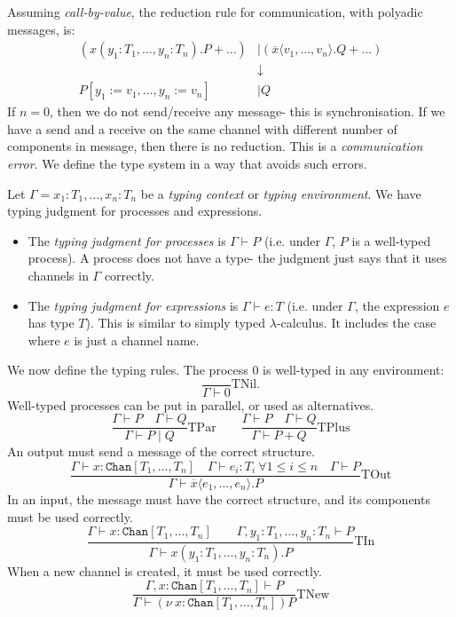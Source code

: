 \documentclass[a4paper, openany]{memoir}
\theoremstyle{definition}
\begin{document}
    Assuming \emph{call-by-value}, the reduction rule for communication, with polyadic messages, is:
    \begin{align*}
        (x(y_1 \colon T_1, \dots, y_n \colon T_n).P + \dots) &\mid 
        (\overline{x}\langle v_1, \dots, v_n \rangle.Q + \dots) \\
        &\downarrow \\
        P[y_1 := v_1, \dots, y_n := v_n] &\mid Q
    \end{align*}
    If $n = 0$, then we do not send/receive any message- this is synchronisation. If we have a send and a receive on the same channel with different number of components in message, then there is no reduction. This is a \emph{communication error}. We define the type system in a way that avoids such errors.

    Let $\Gamma = x_1 \colon T_1, \dots, x_n \colon T_n$ be a \emph{typing context} or \emph{typing environment}. We have typing judgment for processes and expressions.
    \begin{itemize}
        \item The \emph{typing judgment for processes} is $\Gamma \vdash P$ (i.e. under $\Gamma$, $P$ is a well-typed process). A process does not have a type- the judgment just says that it uses channels in $\Gamma$ correctly. 
        \item The \emph{typing judgment for expressions} is $\Gamma \vdash e \colon T$ (i.e. under $\Gamma$, the expression $e$ has type $T$). This is similar to simply typed $\lambda$-calculus. It includes the case where $e$ is just a channel name.
    \end{itemize}
    
    We now define the typing rules. The process $0$ is well-typed in any environment:
    \[\frac{}{\Gamma \vdash 0} \textrm{TNil}.\]
    Well-typed processes can be put in parallel, or used as alternatives.
    \[\frac{\Gamma \vdash P \quad \Gamma \vdash Q}{\Gamma \vdash P \mid Q} \textrm{TPar} \qquad \frac{\Gamma \vdash P \quad \Gamma \vdash Q}{\Gamma \vdash P + Q} \textrm{TPlus}\]
    An output must send a message of the correct structure.
    \[\frac{\Gamma \vdash x \colon \texttt{Chan}[T_1, \dots, T_n] \quad \Gamma \vdash e_i \colon T_i \ \forall 1 \leq i \leq n \quad \Gamma \vdash P}{\Gamma \vdash \overline{x} \langle e_1, \dots, e_n\rangle.P} \textrm{TOut}\]
    In an input, the message must have the correct structure, and its components must be used correctly.
    \[\frac{\Gamma \vdash x \colon \texttt{Chan}[T_1, \dots, T_n] \qquad \Gamma, y_1 \colon T_1, \dots, y_n \colon T_n \vdash P}{\Gamma \vdash x(y_1 \colon T_1, \dots, y_n \colon T_n).P} \textrm{TIn}\]
    When a new channel is created, it must be used correctly.
    \[\frac{\Gamma, x \colon \texttt{Chan}[T_1, \dots, T_n] \vdash P}{\Gamma \vdash (\nu \ x \colon \texttt{Chan}[T_1, \dots, T_n]) P} \textrm{TNew}\]
\end{document}
